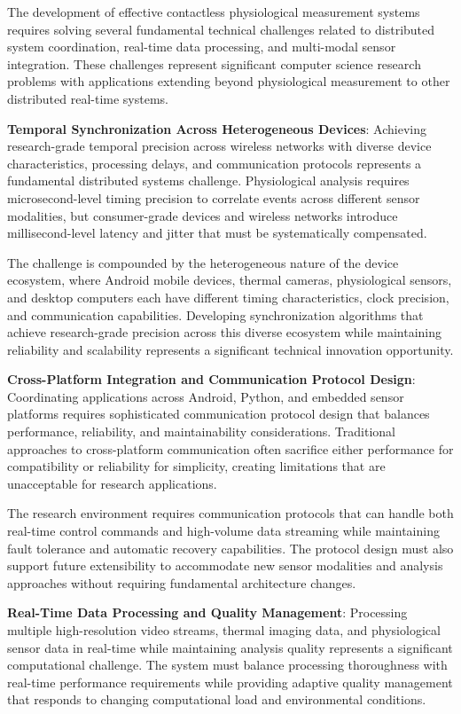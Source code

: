\documentclass[12pt,a4paper]{report}
\begin{document}
The development of effective contactless physiological measurement systems requires solving several fundamental
technical challenges related to distributed system coordination, real-time data processing, and multi-modal sensor
integration. These challenges represent significant computer science research problems with applications extending
beyond physiological measurement to other distributed real-time systems.

\textbf{Temporal Synchronization Across Heterogeneous Devices}: Achieving research-grade temporal precision across wireless
networks with diverse device characteristics, processing delays, and communication protocols represents a fundamental
distributed systems challenge. Physiological analysis requires microsecond-level timing precision to correlate events
across different sensor modalities, but consumer-grade devices and wireless networks introduce millisecond-level latency
and jitter that must be systematically compensated.

The challenge is compounded by the heterogeneous nature of the device ecosystem, where Android mobile devices, thermal
cameras, physiological sensors, and desktop computers each have different timing characteristics, clock precision, and
communication capabilities. Developing synchronization algorithms that achieve research-grade precision across this
diverse ecosystem while maintaining reliability and scalability represents a significant technical innovation
opportunity.

\textbf{Cross-Platform Integration and Communication Protocol Design}: Coordinating applications across Android, Python, and
embedded sensor platforms requires sophisticated communication protocol design that balances performance, reliability,
and maintainability considerations. Traditional approaches to cross-platform communication often sacrifice either
performance for compatibility or reliability for simplicity, creating limitations that are unacceptable for research
applications.

The research environment requires communication protocols that can handle both real-time control commands and
high-volume data streaming while maintaining fault tolerance and automatic recovery capabilities. The protocol design
must also support future extensibility to accommodate new sensor modalities and analysis approaches without requiring
fundamental architecture changes.

\textbf{Real-Time Data Processing and Quality Management}: Processing multiple high-resolution video streams, thermal imaging
data, and physiological sensor data in real-time while maintaining analysis quality represents a significant
computational challenge. The system must balance processing thoroughness with real-time performance requirements while
providing adaptive quality management that responds to changing computational load and environmental conditions.
\end{document}
